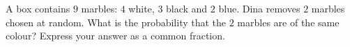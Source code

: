 A box contains $9$ marbles: $4$ white, $3$ black and $2$ blue. Dina removes $2$ marbles chosen at random. What is the probability that the $2$ marbles are of the same colour? Express your answer as a common fraction.
